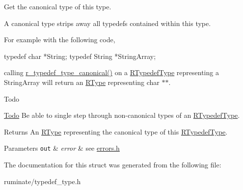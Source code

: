 Get the canonical type of this type. 

A canonical type strips away all typedefs contained within this type.

For example with the following code, 
\begin{DoxyCode}
\textcolor{keyword}{typedef} \textcolor{keywordtype}{char} *String;
\textcolor{keyword}{typedef} String *StringArray;
\end{DoxyCode}
 calling \hyperlink{struct_r_typedef_type_afa3538fc4df5050ba3df60547f36536c}{r\-\_\-typedef\-\_\-type\-\_\-canonical()} on a \hyperlink{struct_r_typedef_type}{R\-Typedef\-Type} representing a {\ttfamily String\-Array} will return an \hyperlink{struct_r_type}{R\-Type} representing {\ttfamily char $\ast$$\ast$}.

\begin{DoxyRefDesc}{Todo}
\item[\hyperlink{todo__todo000008}{Todo}]Be able to single step through non-\/canonical types of an \hyperlink{struct_r_typedef_type}{R\-Typedef\-Type}. \end{DoxyRefDesc}
\begin{DoxyReturn}{Returns}
An \hyperlink{struct_r_type}{R\-Type} representing the canonical type of this \hyperlink{struct_r_typedef_type}{R\-Typedef\-Type}. 
\end{DoxyReturn}

\begin{DoxyParams}[1]{Parameters}
\mbox{\tt out}  & {\em error} & see \hyperlink{errors_8h}{errors.\-h} \\
\hline
\end{DoxyParams}


The documentation for this struct was generated from the following file\-:\begin{DoxyCompactItemize}
\item 
ruminate/typedef\-\_\-type.\-h\end{DoxyCompactItemize}
